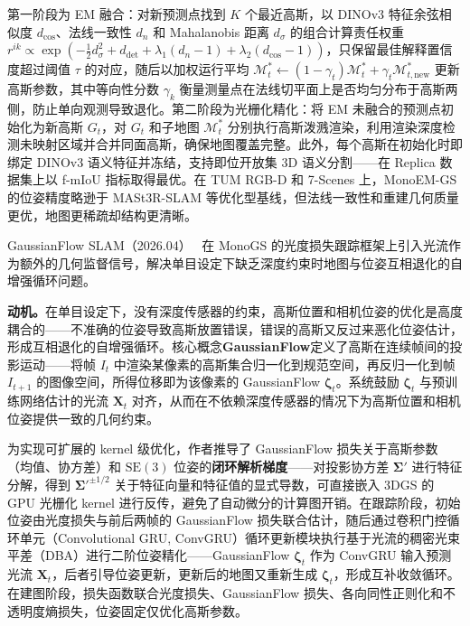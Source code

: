 第一阶段为 EM 融合：对新预测点找到 $K$ 个最近高斯，以 DINOv3 特征余弦相似度 $d_\text{cos}$、法线一致性 $d_n$ 和 Mahalanobis 距离 $d_\sigma$ 的组合计算责任权重 $r^{ik} \propto \exp(-\tfrac{1}{2}d_\sigma^2 + d_\text{det} + \lambda_1(d_n-1) + \lambda_2(d_\text{cos}-1))$，只保留最佳解释置信度超过阈值 $\tau$ 的对应，随后以加权运行平均 $\mathcal{M}^*_t \leftarrow (1-\gamma_t)\mathcal{M}^*_t + \gamma_t \mathcal{M}^*_{t,\text{new}}$ 更新高斯参数，其中等向性分数 $\gamma_k$ 衡量测量点在法线切平面上是否均匀分布于高斯两侧，防止单向观测导致退化。第二阶段为光栅化精化：将 EM 未融合的预测点初始化为新高斯 $G_t$，对 $G_t$ 和子地图 $\mathcal{M}^*_t$ 分别执行高斯泼溅渲染，利用渲染深度检测未映射区域并合并同面高斯，确保地图覆盖完整。此外，每个高斯在初始化时即绑定 DINOv3 语义特征并冻结，支持即位开放集 3D 语义分割——在 Replica 数据集上以 f-mIoU 指标取得最优。在 TUM RGB-D 和 7-Scenes 上，MonoEM-GS 的位姿精度略逊于 MASt3R-SLAM 等优化型基线，但法线一致性和重建几何质量更优，地图更稀疏却结构更清晰。

GaussianFlow SLAM（2026.04）~\cite{2604_15612} 在 MonoGS 的光度损失跟踪框架上引入光流作为额外的几何监督信号，解决单目设定下缺乏深度约束时地图与位姿互相退化的自增强循环问题。

\textbf{动机。}在单目设定下，没有深度传感器的约束，高斯位置和相机位姿的优化是高度耦合的——不准确的位姿导致高斯放置错误，错误的高斯又反过来恶化位姿估计，形成互相退化的自增强循环。核心概念\textbf{GaussianFlow}定义了高斯在连续帧间的投影运动——将帧 $I_t$ 中渲染某像素的高斯集合归一化到规范空间，再反归一化到帧 $I_{t+1}$ 的图像空间，所得位移即为该像素的 GaussianFlow $\boldsymbol{\zeta}_t$。系统鼓励 $\boldsymbol{\zeta}_t$ 与预训练网络估计的光流 $\mathbf{X}_t$ 对齐，从而在不依赖深度传感器的情况下为高斯位置和相机位姿提供一致的几何约束。

为实现可扩展的 kernel 级优化，作者推导了 GaussianFlow 损失关于高斯参数（均值、协方差）和 $\mathrm{SE}(3)$ 位姿的\textbf{闭环解析梯度}——对投影协方差 $\boldsymbol{\Sigma}'$ 进行特征分解，得到 $\boldsymbol{\Sigma}'^{\pm 1/2}$ 关于特征向量和特征值的显式导数，可直接嵌入 3DGS 的 GPU 光栅化 kernel 进行反传，避免了自动微分的计算图开销。在跟踪阶段，初始位姿由光度损失与前后两帧的 GaussianFlow 损失联合估计，随后通过卷积门控循环单元（Convolutional GRU, ConvGRU）循环更新模块执行基于光流的稠密光束平差（DBA）进行二阶位姿精化——GaussianFlow $\boldsymbol{\zeta}_t$ 作为 ConvGRU 输入预测光流 $\mathbf{X}_t$，后者引导位姿更新，更新后的地图又重新生成 $\boldsymbol{\zeta}_t$，形成互补收敛循环。在建图阶段，损失函数联合光度损失、GaussianFlow 损失、各向同性正则化和不透明度熵损失，位姿固定仅优化高斯参数。

